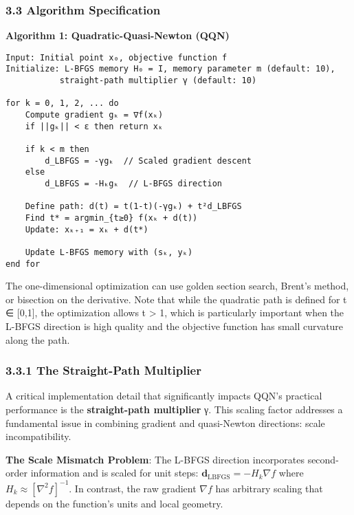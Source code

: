 \hypertarget{algorithm-specification}{%
\subsubsection{3.3 Algorithm Specification}\label{algorithm-specification}}

\textbf{Algorithm 1: Quadratic-Quasi-Newton (QQN)}

\begin{verbatim}
Input: Initial point x₀, objective function f
Initialize: L-BFGS memory H₀ = I, memory parameter m (default: 10),
           straight-path multiplier γ (default: 10)

for k = 0, 1, 2, ... do
    Compute gradient gₖ = ∇f(xₖ)
    if ||gₖ|| < ε then return xₖ

    if k < m then
        d_LBFGS = -γgₖ  // Scaled gradient descent
    else
        d_LBFGS = -Hₖgₖ  // L-BFGS direction

    Define path: d(t) = t(1-t)(-γgₖ) + t²d_LBFGS
    Find t* = argmin_{t≥0} f(xₖ + d(t))
    Update: xₖ₊₁ = xₖ + d(t*)

    Update L-BFGS memory with (sₖ, yₖ)
end for
\end{verbatim}

The one-dimensional optimization can use golden section search, Brent's method, or bisection on the derivative. Note that while the quadratic path is defined for t ∈ {[}0,1{]}, the optimization allows t \textgreater{} 1, which is particularly important when the L-BFGS direction is high quality and the objective function has small curvature along the path.

\hypertarget{the-straight-path-multiplier}{%
\subsubsection{3.3.1 The Straight-Path Multiplier}\label{the-straight-path-multiplier}}

A critical implementation detail that significantly impacts QQN's practical performance is the \textbf{straight-path multiplier} γ.
This scaling factor addresses a fundamental issue in combining gradient and quasi-Newton directions: scale incompatibility.

\textbf{The Scale Mismatch Problem}: The L-BFGS direction incorporates second-order information and is scaled for unit steps: \(\mathbf{d}_{\text{LBFGS}} = -H_k \nabla f\) where \(H_k \approx [\nabla^2 f]^{-1}\).
In contrast, the raw gradient \(\nabla f\) has arbitrary scaling that depends on the function's units and local geometry.

